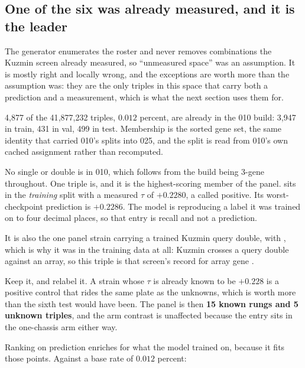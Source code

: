\subsection{One of the six was already measured, and it is the leader}

The generator enumerates the roster and never removes combinations the Kuzmin
screen already measured, so ``unmeasured space'' was an assumption. It is mostly
right and locally wrong, and the exceptions are worth more than the assumption
was: they are the only triples in this space that carry both a prediction and a
measurement, which is what the next section uses them for.

 4{,}877 of the 41{,}877{,}232 triples, $0.012$ percent, are
already in the 010 build: 3{,}947 in train, 431 in val, 499 in test. Membership is
the sorted gene set, the same identity that carried 010's splits into 025, and the
split is read from 010's own cached assignment rather than recomputed.

 No single or double is in 010, which follows from the build
being 3-gene throughout. One triple is, and it is the highest-scoring member of
the panel.    sits in the \emph{training} split
with a measured $\tau$ of $+0.2280$, a called positive. Its worst-checkpoint
prediction is $+0.2286$. The model is reproducing a label it was trained on to
four decimal places, so that entry is recall and not a prediction.

It is also the one panel strain carrying a trained Kuzmin query double,
 with , which is why it was in the training data at all:
Kuzmin crosses a query double against an array, so this triple is that screen's
record for array gene .

 Keep it, and relabel it. A strain whose $\tau$ is
already known to be $+0.228$ is a positive control that rides the same plate as
the unknowns, which is worth more than the sixth test would have been. The panel
is then \textbf{15 known rungs and 5 unknown triples}, and the arm contrast is
unaffected because the entry sits in the one-chassis arm either way.

 Ranking on
prediction enriches for what the model trained on, because it fits those points.
Against a base rate of $0.012$ percent:

